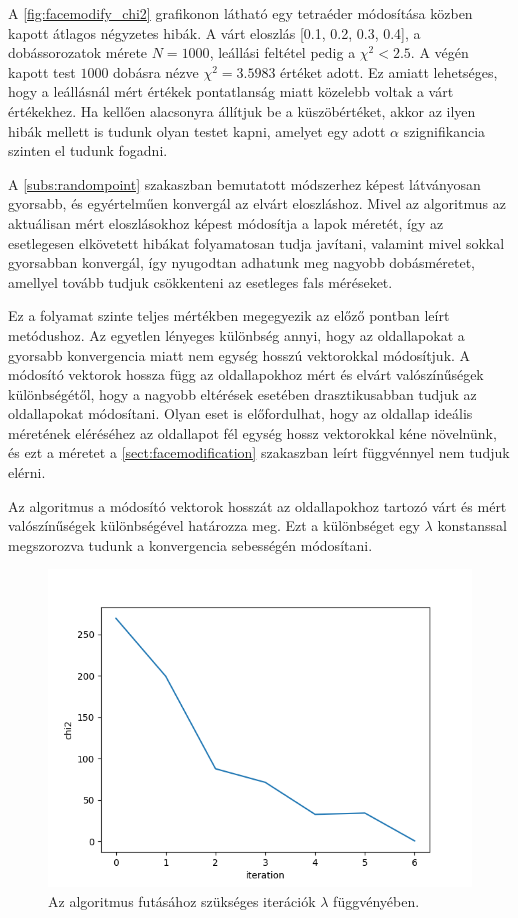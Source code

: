 A \ref{fig:facemodify_chi2} grafikonon látható egy tetraéder módosítása közben kapott átlagos négyzetes hibák.
A várt eloszlás [0.1, 0.2, 0.3, 0.4], a dobássorozatok mérete $N=1000$, leállási feltétel pedig a $\chi^2 < 2.5$.
A végén kapott test $1000$ dobásra nézve $\chi^2 = 3.5983$ értéket adott.
Ez amiatt lehetséges, hogy a leállásnál mért értékek pontatlanság miatt közelebb voltak a várt értékekhez.
Ha kellően alacsonyra állítjuk be a küszöbértéket, akkor az ilyen hibák mellett is tudunk olyan testet kapni, amelyet egy adott $\alpha$ szignifikancia szinten el tudunk fogadni.

A \ref{subs:randompoint} szakaszban bemutatott módszerhez képest látványosan gyorsabb, és egyértelműen konvergál az elvárt eloszláshoz.
Mivel az algoritmus az aktuálisan mért eloszlásokhoz képest módosítja a lapok méretét, így az esetlegesen elkövetett hibákat folyamatosan tudja javítani, valamint mivel sokkal gyorsabban konvergál, így nyugodtan adhatunk meg nagyobb dobásméretet, amellyel tovább tudjuk csökkenteni az esetleges fals méréseket.

\label{sect:ratiomodification}

Ez a folyamat szinte teljes mértékben megegyezik az előző pontban leírt metódushoz.
Az egyetlen lényeges különbség annyi, hogy az oldallapokat a gyorsabb konvergencia miatt nem egység hosszú vektorokkal módosítjuk.
A módosító vektorok hossza függ az oldallapokhoz mért és elvárt valószínűségek különbségétől, hogy a nagyobb eltérések esetében drasztikusabban tudjuk az oldallapokat módosítani.
Olyan eset is előfordulhat, hogy az oldallap ideális méretének eléréséhez az oldallapot fél egység hossz vektorokkal kéne növelnünk, és ezt a méretet a \ref{sect:facemodification} szakaszban leírt függvénnyel nem tudjuk elérni.

Az algoritmus a módosító vektorok hosszát az oldallapokhoz tartozó várt és mért valószínűségek különbségével határozza meg.
Ezt a különbséget egy $\lambda$ konstanssal megszorozva tudunk a konvergencia sebességén módosítani.
\begin{figure}[h!]
	\centering
	\includegraphics[scale=0.7]{images/facemodify_chi2.png}
	\caption{Az algoritmus futásához szükséges iterációk $\lambda$ függvényében.}
	\label{fig:lambda}
\end{figure}

